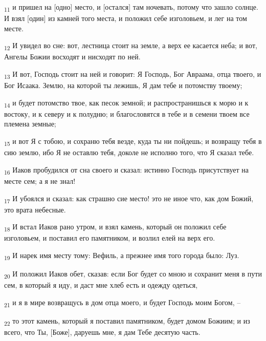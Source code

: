 \begin{tcolorbox}
\textsubscript{11} и пришел на [одно] место, и [остался] там ночевать, потому что зашло солнце. И взял [один] из камней того места, и положил себе изголовьем, и лег на том месте.
\end{tcolorbox}
\begin{tcolorbox}
\textsubscript{12} И увидел во сне: вот, лестница стоит на земле, а верх ее касается неба; и вот, Ангелы Божии восходят и нисходят по ней.
\end{tcolorbox}
\begin{tcolorbox}
\textsubscript{13} И вот, Господь стоит на ней и говорит: Я Господь, Бог Авраама, отца твоего, и Бог Исаака. Землю, на которой ты лежишь, Я дам тебе и потомству твоему;
\end{tcolorbox}
\begin{tcolorbox}
\textsubscript{14} и будет потомство твое, как песок земной; и распространишься к морю и к востоку, и к северу и к полудню; и благословятся в тебе и в семени твоем все племена земные;
\end{tcolorbox}
\begin{tcolorbox}
\textsubscript{15} и вот Я с тобою, и сохраню тебя везде, куда ты ни пойдешь; и возвращу тебя в сию землю, ибо Я не оставлю тебя, доколе не исполню того, что Я сказал тебе.
\end{tcolorbox}
\begin{tcolorbox}
\textsubscript{16} Иаков пробудился от сна своего и сказал: истинно Господь присутствует на месте сем; а я не знал!
\end{tcolorbox}
\begin{tcolorbox}
\textsubscript{17} И убоялся и сказал: как страшно сие место! это не иное что, как дом Божий, это врата небесные.
\end{tcolorbox}
\begin{tcolorbox}
\textsubscript{18} И встал Иаков рано утром, и взял камень, который он положил себе изголовьем, и поставил его памятником, и возлил елей на верх его.
\end{tcolorbox}
\begin{tcolorbox}
\textsubscript{19} И нарек имя месту тому: Вефиль, а прежнее имя того города было: Луз.
\end{tcolorbox}
\begin{tcolorbox}
\textsubscript{20} И положил Иаков обет, сказав: если Бог будет со мною и сохранит меня в пути сем, в который я иду, и даст мне хлеб есть и одежду одеться,
\end{tcolorbox}
\begin{tcolorbox}
\textsubscript{21} и я в мире возвращусь в дом отца моего, и будет Господь моим Богом, --
\end{tcolorbox}
\begin{tcolorbox}
\textsubscript{22} то этот камень, который я поставил памятником, будет домом Божиим; и из всего, что Ты, [Боже], даруешь мне, я дам Тебе десятую часть.
\end{tcolorbox}
